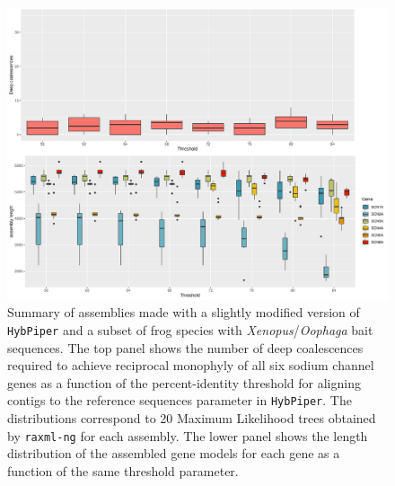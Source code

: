\documentclass{article}
\begin{document}
\begin{figure}[h!]
    \centering
    \includegraphics[scale=0.5]{figures/summary_alignments_xenPum_ref_HPfixed.pdf}
    \caption{Summary of assemblies made with a slightly modified version of \texttt{HybPiper} and a subset of frog species with \textit{Xenopus}/\textit{Oophaga} bait sequences. The top panel shows the number of deep coalescences required to achieve reciprocal monophyly of all six sodium channel genes as a function of the percent-identity threshold for aligning contigs to the reference sequences parameter in \texttt{HybPiper}. The distributions correspond to 20 Maximum Likelihood trees obtained by \texttt{raxml-ng} for each assembly. The lower panel shows the length distribution of the assembled gene models for each gene as a function of the same threshold parameter.}
    \label{fig:my_label}
\end{figure}
\clearpage
\end{document}
